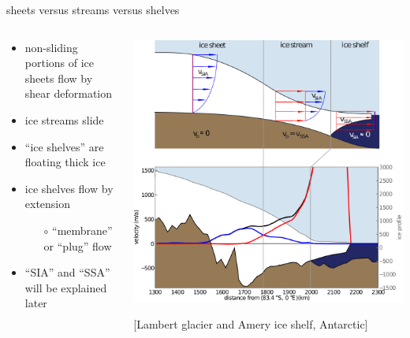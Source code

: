 \documentclass{beamer}
\begin{document}
\begin{frame}{sheets versus streams versus shelves}

\begin{columns}
\begin{column}{0.35\textwidth}
\small
\begin{itemize}
\small
\item non-sliding portions of ice sheets flow by shear deformation
\item ice streams slide
\item ``ice shelves'' are floating thick ice
\item ice shelves flow by extension
  \begin{itemize}
  \scriptsize
  \item[$\circ$] ``membrane'' or ``plug'' flow
  \end{itemize}
\item ``SIA'' and ``SSA'' will be explained later
\end{itemize}
\end{column}

\begin{column}{0.65\textwidth}
\includegraphics[width=\textwidth]{siassacartoon-lambert}

\begin{center}
\vspace{-0.18in}
\tiny [Lambert glacier and Amery ice shelf, Antarctic]
\end{center}
\end{column}
\end{columns}
\end{frame}
\end{document}
